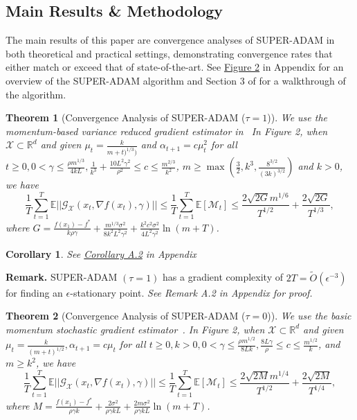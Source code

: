 \documentclass{article}
\newtheorem{theorem}{Theorem}[section]
\newtheorem{corollary}{Corollary}[section]
\begin{document}
\subsection{Main Results \& Methodology}
The main results of this paper are convergence analyses of SUPER-ADAM in both theoretical and practical settings, demonstrating convergence rates that either match or exceed that of state-of-the-art. See \hyperref[fig2]{Figure 2} in Appendix for an overview of the SUPER-ADAM algorithm and
Section 3 of \cite{https://doi.org/10.48550/arxiv.2106.08208} for a walkthrough of the algorithm.
\begin{theorem}[Convergence Analysis of SUPER-ADAM ($\tau = 1$)]
	We use the momentum-based variance reduced gradient estimator in~\cite{https://doi.org/10.48550/arxiv.1905.10018, https://doi.org/10.48550/arxiv.1905.05920}
	In Figure 2, when $\mathcal{X}\subset\mathbb{R}^d$ and given $\mu_t = \frac{k}{m+t)^{1/3})}$ and $\alpha_{t+1}=c\mu^2_t$ for all $t\geq 0, 0 < \gamma \leq \frac{\rho m^{1/3}}{4kL}, \frac{1}{k^3} + \frac{10L^2 \gamma^2}{\rho^2}\leq c\leq \frac{m^{2/3}}{k^2}$,
	$m\geq\max\left(\frac{3}{2}, k^3, \frac{8^{3/2}}{(3k)^{3/2}}\right)$ and $k > 0$, we have
	\begin{equation}
		\frac{1}{T}\sum^T_{t=1}\mathbb{E}||\mathcal{G}_{\mathcal{X}}(x_t, \nabla f(x_t), \gamma)||\leq
		\frac{1}{T}\sum^T_{t=1}\mathbb{E}[\mathcal{M}_t]\leq
		\frac{2\sqrt{2G}m^{1/6}}{T^{1/2}} + \frac{2\sqrt{2G}}{T^{1/3}},
	\end{equation}
	where $G = \frac{f(x_1) - f^*}{k\rho\gamma} + \frac{m^{1/3}\sigma^2}{8k^2 L^2 \gamma^2} + \frac{k^2 c^2 \sigma^2}{4L^2 \gamma^2}\ln(m+T)$.
\end{theorem}
\begin{corollary}
		See \hyperref[coro51appendix]{Corollary A.2} in Appendix
\end{corollary}
\textbf{Remark.} SUPER-ADAM $(\tau = 1)$ has a gradient complexity of $2T = \tilde{O}(\epsilon^{-3})$ for finding an $\epsilon$-stationary point. \textit{See Remark A.2 in Appendix for proof.}
\begin{theorem}[Convergence Analysis of SUPER-ADAM ($\tau = 0$)]
	We use the basic momentum stochastic gradient estimator~\cite{https://doi.org/10.48550/arxiv.1412.6980}.
	In Figure 2, when $\mathcal{X}\subset \mathbb{R}^d$ and given $\mu_t = \frac{k}{(m+t)^{1/2}}, \alpha_{t+1} = c\mu_t$ for all $t\geq 0, k > 0, 0 < \gamma \leq \frac{\rho m^{1/2}}{8Lk}, \frac{8L\gamma}{\rho}\leq c\leq \frac{m^{1/2}}{k}$,
	and $m\geq k^2$, we have
	\begin{equation}
		\frac{1}{T}\sum^T_{t=1}\mathbb{E}||\mathcal{G}_{\mathcal{X}}(x_t, \nabla f(x_t), \gamma)||\leq
		\frac{1}{T}\sum^T_{t=1}\mathbb{E}[\mathcal{M}_t]\leq
		\frac{2\sqrt{2M}m^{1/4}}{T^{1/2}} + \frac{2\sqrt{2M}}{T^{1/4}},
	\end{equation}
	where $M = \frac{f(x_1) - f^*}{\rho\gamma k} + \frac{2\sigma^2}{\rho\gamma kL} + \frac{2m\sigma^2}{\rho\gamma kL}\ln(m+T)$.
\end{theorem}
\end{document}
